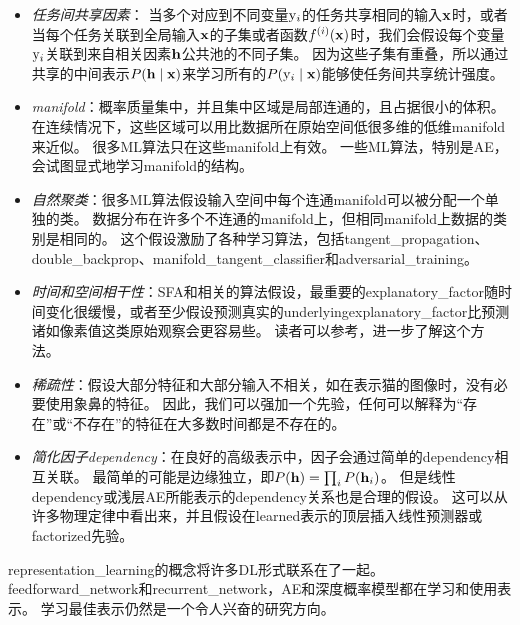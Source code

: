 \begin{itemize}
	\item \emph{任务间共享因素}：
	当多个对应到不同变量$\mathrm{y}_i$的任务共享相同的输入$\mathbf{x}$时，或者当每个任务关联到全局输入$\mathbf{x}$的子集或者函数$f^{(i)}(\mathbf{x})$时，我们会假设每个变量$\mathrm{y}_i$关联到来自相关因素$\mathbf{h}$公共池的不同子集。
	因为这些子集有重叠，所以通过共享的中间表示$ P(\mathbf{h} \mid \mathbf{x})$来学习所有的$P(\mathrm{y}_i \mid \mathbf{x})$能够使任务间共享统计强度。


	\item \emph{\gls{manifold}}：概率质量集中，并且集中区域是局部连通的，且占据很小的体积。
	在连续情况下，这些区域可以用比数据所在原始空间低很多维的低维\gls{manifold}来近似。
	很多\gls{ML}算法只在这些\gls{manifold}上有效\citep{Goodfellow-2015-adversarial}。
	一些\gls{ML}算法，特别是\gls{AE}，会试图显式地学习\gls{manifold}的结构。


	\item \emph{自然聚类}：很多\gls{ML}算法假设输入空间中每个连通\gls{manifold}可以被分配一个单独的类。
	数据分布在许多个不连通的\gls{manifold}上，但相同\gls{manifold}上数据的类别是相同的。
	这个假设激励了各种学习算法，包括\gls{tangent_propagation}、\gls{double_backprop}、\gls{manifold_tangent_classifier}和\gls{adversarial_training}。


	\item \emph{时间和空间相干性}：\gls{SFA}和相关的算法假设，最重要的\gls{explanatory_factor}随时间变化很缓慢，或者至少假设预测真实的\gls{underlying}\gls{explanatory_factor}比预测诸如像素值这类原始观察会更容易些。
	读者可以参考，进一步了解这个方法。


	\item \emph{稀疏性}：假设大部分特征和大部分输入不相关，如在表示猫的图像时，没有必要使用象鼻的特征。
	因此，我们可以强加一个先验，任何可以解释为``存在''或``不存在''的特征在大多数时间都是不存在的。


	\item \emph{简化因子\gls{dependency}}：在良好的高级表示中，因子会通过简单的\gls{dependency}相互关联。
	最简单的可能是边缘独立，即$P(\mathbf{h}) = \prod_i P(\mathbf{h}_i)$。
	但是线性\gls{dependency}或浅层\gls{AE}所能表示的\gls{dependency}关系也是合理的假设。
	这可以从许多物理定律中看出来，并且假设在\gls{learned}表示的顶层插入线性预测器或\gls{factorized}先验。
\end{itemize}


\gls{representation_learning}的概念将许多\gls{DL}形式联系在了一起。
\gls{feedforward_network}和\gls{recurrent_network}，\gls{AE}和深度概率模型都在学习和使用表示。
学习最佳表示仍然是一个令人兴奋的研究方向。

